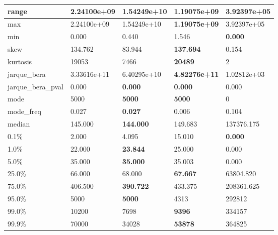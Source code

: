\begin{table}[H]
\begin{tabular}{|l|m{10em}|m{10em}|m{10em}|m{10em}|}
\hline range & 2.24100e+09 & \cellcolor[rgb]{0.9, 0.54, 0.52} 1.54249e+10 & \bfseries 1.19075e+09 & 3.92397e+05 \\
\hline max & 2.24100e+09 & \cellcolor[rgb]{0.9, 0.54, 0.52} 1.54249e+10 & \bfseries 1.19075e+09 & 3.92397e+05 \\
\hline min & 0.000 & 0.440 & \cellcolor[rgb]{0.9, 0.54, 0.52} 1.546 & \bfseries 0.000 \\
\hline skew & 134.762 & 83.944 & \bfseries 137.694 & \cellcolor[rgb]{0.9, 0.54, 0.52} 0.154 \\
\hline kurtosis & 19053 & 7466 & \bfseries 20489 & \cellcolor[rgb]{0.9, 0.54, 0.52} 2 \\
\hline jarque\_bera & 3.33616e+11 & 6.40295e+10 & \bfseries 4.82276e+11 & \cellcolor[rgb]{0.9, 0.54, 0.52} 1.02812e+03 \\
\hline jarque\_bera\_pval & 0.000 & \bfseries 0.000 & \bfseries 0.000 & \cellcolor[rgb]{0.9, 0.54, 0.52} 0.000 \\
\hline mode & 5000 & \bfseries 5000 & \bfseries 5000 & \cellcolor[rgb]{0.9, 0.54, 0.52} 0 \\
\hline mode\_freq & 0.027 & \bfseries 0.027 & 0.006 & \cellcolor[rgb]{0.9, 0.54, 0.52} 0.104 \\
\hline median & 145.000 & \bfseries 144.000 & 149.683 & \cellcolor[rgb]{0.9, 0.54, 0.52} 137376.175 \\
\hline 0.1\% & 2.000 & 4.095 & \cellcolor[rgb]{0.9, 0.54, 0.52} 15.010 & \bfseries 0.000 \\
\hline 1.0\% & 22.000 & \bfseries 23.844 & 25.000 & \cellcolor[rgb]{0.9, 0.54, 0.52} 0.000 \\
\hline 5.0\% & 35.000 & \bfseries 35.000 & 35.003 & \cellcolor[rgb]{0.9, 0.54, 0.52} 0.000 \\
\hline 25.0\% & 66.000 & 68.000 & \bfseries 67.667 & \cellcolor[rgb]{0.9, 0.54, 0.52} 63804.820 \\
\hline 75.0\% & 406.500 & \bfseries 390.722 & 433.375 & \cellcolor[rgb]{0.9, 0.54, 0.52} 208361.625 \\
\hline 95.0\% & 5000 & \bfseries 5000 & 4313 & \cellcolor[rgb]{0.9, 0.54, 0.52} 292812 \\
\hline 99.0\% & 10200 & 7698 & \bfseries 9396 & \cellcolor[rgb]{0.9, 0.54, 0.52} 334157 \\
\hline 99.9\% & 70000 & 34028 & \bfseries 53878 & \cellcolor[rgb]{0.9, 0.54, 0.52} 364825 \\
\hline
\end{tabular}
\end{table}
